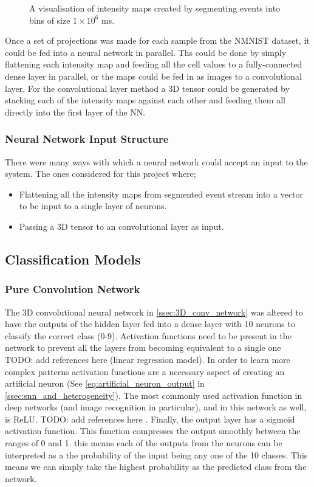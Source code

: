 \begin{figure}[htb]
    \caption{A visualisation of intensity maps created by segmenting events into bins of size $ 1 \times 10^6 $ ms.}%
    \label{fig:nmnist_spikes_to_intensity_map}%
\end{figure}

Once a set of projections was made for each sample from the NMNIST dataset, it could be fed into a neural network in parallel. Ths could be done by simply flattening each intensity map and feeding all the cell values to a fully-connected dense layer in parallel, or the maps could be fed in as images to a convolutional layer. For the convolutional layer method a 3D tensor could be generated by stacking each of the intensity maps against each other and feeding them all directly into the first layer of the NN.

\subsubsection{Neural Network Input Structure}

There were many ways with which a neural network could accept an input to the system. The ones considered for this project where;

\begin{itemize}
    \item Flattening all the intensity maps from segmented event stream into a vector to be input to a single layer of neurons.
    \item Passing a 3D tensor to an convolutional layer as input.
\end{itemize}

\subsection{Classification Models}

\subsubsection{Pure Convolution Network}

The 3D convolutional neural network in \cref{ssec:3D_conv_network} was altered to have the outputs of the hidden layer fed into a dense layer with 10 neurons to classify the correct class (0-9). Activation functions need to be present in the network to prevent all the layers from becoming equivalent to a single one \color{red} TODO: add references here \color{black} (linear regression model). In order to learn more complex patterns activation functions are a necessary aspect of creating an artificial neuron (See \cref{eq:artificial_neuron_output} in \cref{ssec:snn_and_heterogeneity}). The most commonly used activation function in deep networks (and image recognition in particular), and in this network as well, is ReLU. \color{red} TODO: add references here \color{black}. Finally, the output layer has a sigmoid activation function. This function compresses the output smoothly between the ranges of 0 and 1. this means each of the outputs from the neurons can be interpreted as a the probability of the input being any one of the 10 classes. This means we can simply take the highest probability as the predicted class from the network.

